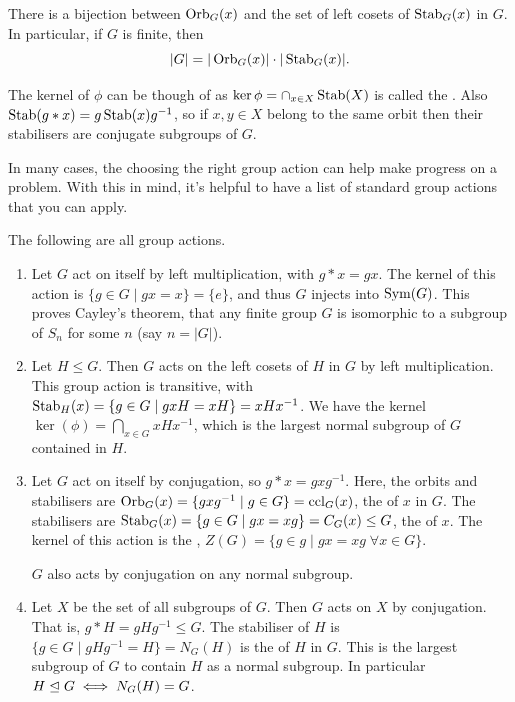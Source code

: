 \documentclass[a4paper]{scrreprt}
\begin{document}
\begin{theorem}
	There is a bijection between $\operatorname{Orb}_G(x)$ and the set of left cosets of $\operatorname{Stab}_G(x)$ in $G$. In particular, if $G$ is finite, then
	$$
	|G| = |\operatorname{Orb}_G(x)| \cdot |\operatorname{Stab}_G(x)|.
	$$
\end{theorem}

\begin{remark}
	The kernel of $\phi$ can be though of as $\operatorname{ker} \phi = \cap_{x \in X} \operatorname{Stab}(X)$ is called the .
	Also $\operatorname{Stab}(g * x) = g \operatorname{Stab}(x) g^{-1}$, so if $x, y \in X$ belong to the same orbit then their stabilisers are conjugate subgroups of $G$.
\end{remark}


In many cases, the choosing the right group action can help make progress on a problem. With this in mind, it's helpful to have a list of standard group actions that you can apply.

\begin{example}
	The following are all group actions.
	\begin{enumerate}[label=(\roman*)]
		\item Let $G$ act on itself by left multiplication, with $g * x = gx$. The kernel of this action is $\{g \in G \mid gx = x \} = \{e\}$, and thus $G$ injects into $\operatorname{Sym}(G)$. This proves Cayley's theorem, that any finite group $G$ is isomorphic to a subgroup of $S_n$ for some $n$ (say $n = |G|$).
		\item Let $H \leq G$. Then $G$ acts on the left cosets of $H$ in $G$ by left multiplication. This group action is transitive, with $\operatorname{Stab}_H(x) = \{ g \in G \mid gxH = xH \} = xHx^{-1}$. We have the kernel $\ker(\phi) = \bigcap_{x \in G} xHx^{-1}$, which is the largest normal subgroup of $G$ contained in $H$.
		\item Let $G$ act on itself by conjugation, so $g * x = gxg^{-1}$. Here, the orbits and stabilisers are $\operatorname{Orb}_G(x) = \{ gxg^{-1} \mid g \in G \} = \operatorname{ccl}_G(x)$, the  of $x$ in $G$. The stabilisers are $\operatorname{Stab}_G(x) = \{ g \in G \mid gx = xg \} = C_G(x) \leq G$, the  of $x$. The kernel of this action is the , $Z(G) = \{ g \in g \mid gx = xg \; \forall x \in G \}$.
		
		$G$ also acts by conjugation on any normal subgroup.

		\item Let $X$ be the set of all subgroups of $G$. Then $G$ acts on $X$ by conjugation. That is, $g * H = g H g^{-1} \leq G$. The stabiliser of $H$ is $\{g \in G \mid gHg^{-1} = H \} = N_G(H)$ is the  of $H$ in $G$. This is the largest subgroup of $G$ to contain $H$ as a normal subgroup. In particular $H \trianglelefteq G \iff N_G(H) = G$. 
	\end{enumerate}
\end{example}
\end{document}
